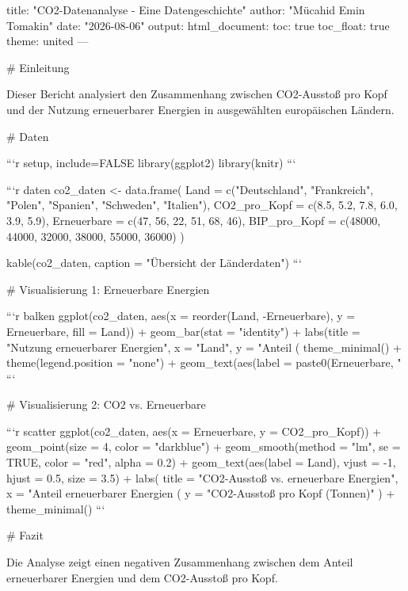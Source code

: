 title: "CO2-Datenanalyse - Eine Datengeschichte"
author: "Mücahid Emin Tomakin"
date: "2026-08-06"
output:
  html_document:
    toc: true
    toc_float: true
    theme: united
---

# Einleitung

Dieser Bericht analysiert den Zusammenhang zwischen CO2-Ausstoß pro Kopf und 
der Nutzung erneuerbarer Energien in ausgewählten europäischen Ländern.

# Daten

```{r setup, include=FALSE}
library(ggplot2)
library(knitr)
```

```{r daten}
co2_daten <- data.frame(
  Land = c("Deutschland", "Frankreich", "Polen", "Spanien", "Schweden", "Italien"),
  CO2_pro_Kopf = c(8.5, 5.2, 7.8, 6.0, 3.9, 5.9),
  Erneuerbare = c(47, 56, 22, 51, 68, 46),
  BIP_pro_Kopf = c(48000, 44000, 32000, 38000, 55000, 36000)
)

kable(co2_daten, caption = "Übersicht der Länderdaten")
```

# Visualisierung 1: Erneuerbare Energien

```{r balken}
  ggplot(co2_daten, aes(x = reorder(Land, -Erneuerbare), y = Erneuerbare, fill = Land)) +
  geom_bar(stat = "identity") +
  labs(title = "Nutzung erneuerbarer Energien", 
       x = "Land", y = "Anteil (%
  theme_minimal() +
  theme(legend.position = "none") +
  geom_text(aes(label = paste0(Erneuerbare, "%
```

# Visualisierung 2: CO2 vs. Erneuerbare

```{r scatter}
ggplot(co2_daten, aes(x = Erneuerbare, y = CO2_pro_Kopf)) +
  geom_point(size = 4, color = "darkblue") +
  geom_smooth(method = "lm", se = TRUE, color = "red", alpha = 0.2) +
  geom_text(aes(label = Land), vjust = -1, hjust = 0.5, size = 3.5) +
  labs(
    title = "CO2-Ausstoß vs. erneuerbare Energien",
    x = "Anteil erneuerbarer Energien (%
    y = "CO2-Ausstoß pro Kopf (Tonnen)"
  ) +
  theme_minimal()
```

# Fazit

Die Analyse zeigt einen negativen Zusammenhang zwischen dem Anteil
erneuerbarer Energien und dem CO2-Ausstoß pro Kopf.